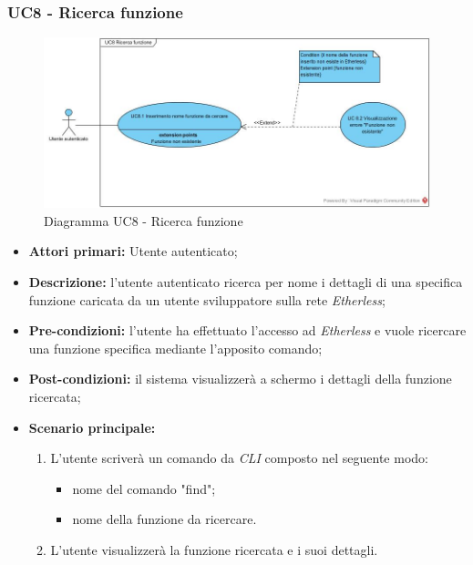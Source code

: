 \subsubsection{UC8 - Ricerca funzione}
\begin{figure}[h]
	\centering
	\includegraphics[width=\linewidth]{res/img/UC8.jpg}
	\caption{Diagramma UC8 - Ricerca funzione}
\end{figure}
\begin{itemize}
	\item \textbf{Attori primari:} Utente autenticato;
	\item \textbf{Descrizione:} l'utente autenticato ricerca per nome i dettagli di una specifica funzione caricata da un utente sviluppatore sulla rete \textit{Etherless};
	\item \textbf{Pre-condizioni:} l'utente ha effettuato l'accesso ad \textit{Etherless} e vuole ricercare una funzione specifica mediante l'apposito comando;
	\item \textbf{Post-condizioni:} il sistema visualizzerà a schermo i dettagli della funzione ricercata;
	\item \textbf{Scenario principale:}
	\begin{enumerate}
		\item L'utente scriverà un comando da \textit{CLI\glos} composto nel seguente modo:
		\begin{itemize}
			\item nome del comando "find";
			\item nome della funzione da ricercare.
		\end{itemize}
        \item L'utente visualizzerà la funzione ricercata e i suoi dettagli.
	\end{enumerate}
\end{itemize}

